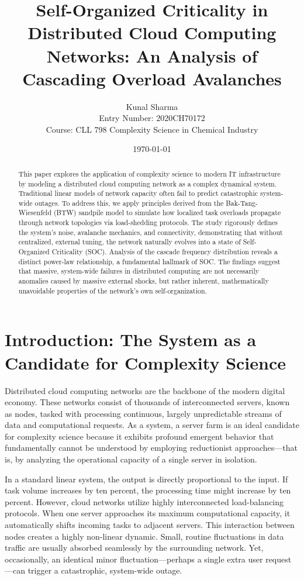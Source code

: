 \documentclass[12pt,a4paper]{article}
\title{\textbf{Self-Organized Criticality in Distributed Cloud Computing Networks: An Analysis of Cascading Overload Avalanches}}
\author{
    Kunal Sharma \\ 
    Entry Number: 2020CH70172 \\ 
    Course: CLL 798 Complexity Science in Chemical Industry
}
\date{\today}
\begin{document}
\maketitle

\begin{abstract}
This paper explores the application of complexity science to modern IT infrastructure by modeling a distributed cloud computing network as a complex dynamical system. Traditional linear models of network capacity often fail to predict catastrophic system-wide outages. To address this, we apply principles derived from the Bak-Tang-Wiesenfeld (BTW) sandpile model to simulate how localized task overloads propagate through network topologies via load-shedding protocols. The study rigorously defines the system's noise, avalanche mechanics, and connectivity, demonstrating that without centralized, external tuning, the network naturally evolves into a state of Self-Organized Criticality (SOC). Analysis of the cascade frequency distribution reveals a distinct power-law relationship, a fundamental hallmark of SOC. The findings suggest that massive, system-wide failures in distributed computing are not necessarily anomalies caused by massive external shocks, but rather inherent, mathematically unavoidable properties of the network's own self-organization.
\end{abstract}

\section{Introduction: The System as a Candidate for Complexity Science}
Distributed cloud computing networks are the backbone of the modern digital economy. These networks consist of thousands of interconnected servers, known as nodes, tasked with processing continuous, largely unpredictable streams of data and computational requests. As a system, a server farm is an ideal candidate for complexity science because it exhibits profound emergent behavior that fundamentally cannot be understood by employing reductionist approaches—that is, by analyzing the operational capacity of a single server in isolation.

In a standard linear system, the output is directly proportional to the input. If task volume increases by ten percent, the processing time might increase by ten percent. However, cloud networks utilize highly interconnected load-balancing protocols. When one server approaches its maximum computational capacity, it automatically shifts incoming tasks to adjacent servers. This interaction between nodes creates a highly non-linear dynamic. Small, routine fluctuations in data traffic are usually absorbed seamlessly by the surrounding network. Yet, occasionally, an identical minor fluctuation—perhaps a single extra user request—can trigger a catastrophic, system-wide outage. 
\end{document}
